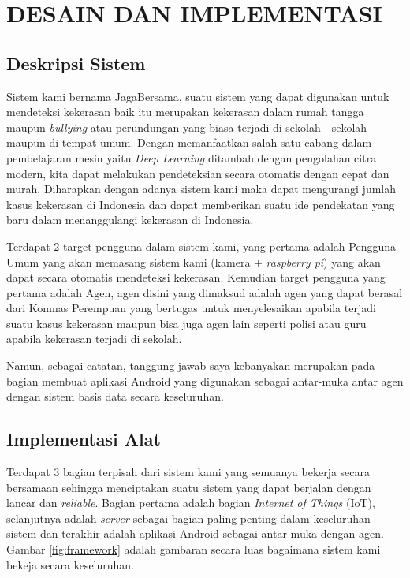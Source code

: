 \chapter{DESAIN DAN IMPLEMENTASI}


\section{Deskripsi Sistem}

Sistem kami bernama JagaBersama, suatu sistem yang dapat digunakan untuk mendeteksi kekerasan baik itu merupakan kekerasan dalam rumah tangga maupun \textit{bullying} atau perundungan yang biasa terjadi di sekolah - sekolah maupun di tempat umum. Dengan memanfaatkan salah satu cabang dalam pembelajaran mesin yaitu \textit{Deep Learning} ditambah dengan pengolahan citra modern, kita dapat melakukan pendeteksian secara otomatis dengan cepat dan murah. Diharapkan dengan adanya sistem kami maka dapat mengurangi jumlah kasus kekerasan di Indonesia dan dapat memberikan suatu ide pendekatan yang baru dalam menanggulangi kekerasan di Indonesia.

Terdapat 2 target pengguna dalam sistem kami, yang pertama adalah Pengguna Umum yang akan memasang sistem kami (kamera + \textit{raspberry pi}) yang akan dapat secara otomatis mendeteksi kekerasan. Kemudian target pengguna yang pertama adalah Agen, agen disini yang dimaksud adalah agen yang dapat berasal dari Komnas Perempuan yang bertugas untuk menyelesaikan apabila terjadi suatu kasus kekerasan maupun bisa juga agen lain seperti polisi atau guru apabila kekerasan terjadi di sekolah.

Namun, sebagai catatan, tanggung jawab saya kebanyakan merupakan pada bagian membuat aplikasi Android yang digunakan sebagai antar-muka antar agen dengan sistem basis data secara keseluruhan.

\section{Implementasi Alat}

Terdapat 3 bagian terpisah dari sistem kami yang semuanya bekerja secara bersamaan sehingga menciptakan suatu sistem yang dapat berjalan dengan lancar dan \textit{reliable}. Bagian pertama adalah bagian \textit{Internet of Things} (IoT), selanjutnya adalah \textit{server} sebagai bagian paling penting dalam keseluruhan sistem dan terakhir adalah aplikasi Android sebagai antar-muka dengan agen. Gambar \ref{fig:framework} adalah gambaran secara luas bagaimana sistem kami bekeja secara keseluruhan.


